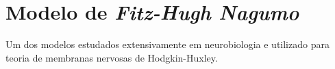 
\section{\textbf{Modelo de \textit{Fitz-Hugh Nagumo}}}
Um dos modelos estudados extensivamente em neurobiologia e utilizado para teoria de membranas nervosas de Hodgkin-Huxley.





